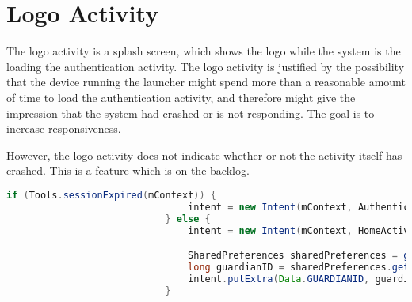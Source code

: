 \section{Logo Activity}
The logo activity is a splash screen, which shows the \giraf[] logo while the system is the loading the authentication activity. The logo activity is justified by the possibility that the device running the launcher might spend more than a reasonable amount of time to load the authentication activity, and therefore might give the impression that the system had crashed or is not responding. The goal is to increase responsiveness. 

However, the logo activity does not indicate whether or not the activity itself has crashed. This is a feature which is on the backlog. 

\begin{lstlisting}[style=sourceCode, language=JAVA, caption=LogoActivity.java, label=lst:logoActivity] 
		if (Tools.sessionExpired(mContext)) {
			            		intent = new Intent(mContext, AuthenticationActivity.class);
			            	} else {
			            		intent = new Intent(mContext, HomeActivity.class);

			            		SharedPreferences sharedPreferences = getSharedPreferences(Data.TIMERKEY, 0);
			            		long guardianID = sharedPreferences.getLong(Data.GUARDIANID, -1);
		            			intent.putExtra(Data.GUARDIANID, guardianID);
			            	}
\end{lstlisting}

